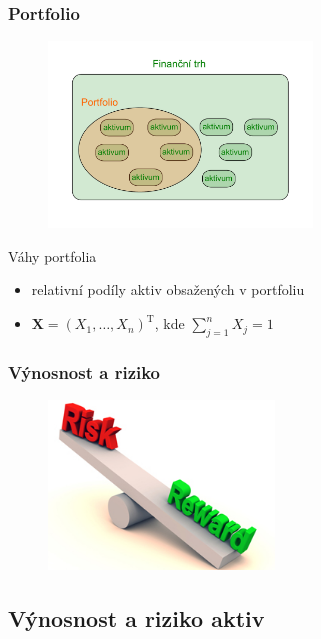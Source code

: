 \documentclass[xcolor=dvipsnames]{beamer}
\theoremstyle{definition} \newtheorem{definice}[veta]{Definice}
\theoremstyle{remark}
\begin{document}
\begin{frame}
  \frametitle{Portfolio}

 \begin{figure}[!htbp]
  \centering 
  \includegraphics[width=7cm, clip, trim= 0 80 0 60]{IMG/portfolio.pdf}
 \end{figure}

\textcolor{OliveGreen}{Váhy portfolia}
   \begin{itemize}
    \item relativní podíly aktiv obsažených v portfoliu
    \item $\boldsymbol{X}=(X_1,\dots,X_n)^\mathrm{T}$, kde $\sum_{j=1}^nX_j=1$
   \end{itemize}
\end{frame}


\begin{frame}
  \frametitle{Výnosnost a riziko}
  \begin{figure}[!htbp]
  \centering 
  \includegraphics[width=6cm]{IMG/houpacka.jpg}
 \end{figure}
\end{frame}

\subsection{Výnosnost a riziko aktiv}
\end{document}
